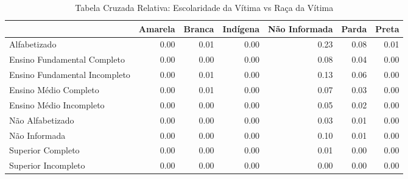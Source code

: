 \begin{table}[ht]
\centering
\begin{tabular}{lrrrrrr}
  \hline
 & Amarela & Branca & Indígena & Não Informada & Parda & Preta \\ 
  \hline
Alfabetizado & 0.00 & 0.01 & 0.00 & 0.23 & 0.08 & 0.01 \\ 
  Ensino Fundamental Completo & 0.00 & 0.00 & 0.00 & 0.08 & 0.04 & 0.00 \\ 
  Ensino Fundamental Incompleto & 0.00 & 0.01 & 0.00 & 0.13 & 0.06 & 0.00 \\ 
  Ensino Médio Completo & 0.00 & 0.01 & 0.00 & 0.07 & 0.03 & 0.00 \\ 
  Ensino Médio Incompleto & 0.00 & 0.00 & 0.00 & 0.05 & 0.02 & 0.00 \\ 
  Não Alfabetizado & 0.00 & 0.00 & 0.00 & 0.03 & 0.01 & 0.00 \\ 
  Não Informada & 0.00 & 0.00 & 0.00 & 0.10 & 0.01 & 0.00 \\ 
  Superior Completo & 0.00 & 0.00 & 0.00 & 0.01 & 0.00 & 0.00 \\ 
  Superior Incompleto & 0.00 & 0.00 & 0.00 & 0.00 & 0.00 & 0.00 \\ 
   \hline
\end{tabular}
\caption{Tabela Cruzada Relativa: Escolaridade da Vítima vs Raça da Vítima} 
\end{table}
